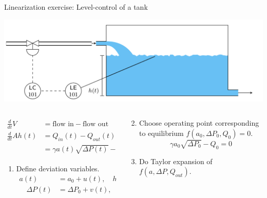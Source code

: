 \documentclass[dvisvgm,hypertex,aspectratio=169]{beamer}
\begin{document}
\begin{frame}[label=Ex1]{Linearization exercise: Level-control of a tank}

  \footnotesize
  
  \begin{center}
    \includegraphics[width=0.5\linewidth]{tank-with-valve.png}
  \end{center}

  \begin{columns}
    \begin{column}{0.6\columnwidth}

      \begin{align*}
        \frac{d}{dt} V &= \text{flow in} - \text{flow out}\\
        \frac{d}{dt} Ah(t) &= Q_{in}(t) - Q_{out}(t)\\
        &= \gamma a(t) \sqrt{\Delta P(t)} - Q_{out}(t) = f(a, \Delta P, Q_{out})
      \end{align*}
    \begin{enumerate}
      \item Define deviation variables.
        \begin{align*} a(t) &= a_0 + u(t), \quad h(t) = h_0 + y(t),\\
          \quad \Delta P(t) &= \Delta P_0 + v(t),
                              \quad Q_{out}(t) = Q_0 + w(t)
        \end{align*}
      \end{enumerate}

    \end{column}

    \begin{column}{0.5\columnwidth}

      \begin{enumerate}
      \setcounter{enumi}{1}
      \item Choose operating point corresponding to equilibrium \(f(a_0, \Delta P_0, Q_0) = 0\).
        \[ \gamma a_0 \sqrt{\Delta P_0} - Q_0 = 0\]
    \item  Do Taylor expansion of \(f(a, \Delta P, Q_{out})\).


\end{enumerate}
\end{column}
\end{columns}
\end{frame}
\end{document}
